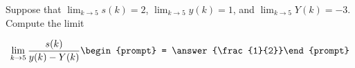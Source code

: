 \documentclass{ximera}
\author{Matthew Carr}
\begin{document}
\begin{exercise}
Suppose that $\lim_{k\to5}s(k)=2$, $\lim_{k\to5}y(k)=1$, and $\lim_{k\to5}Y(k)=-3$. Compute the limit

\[
\lim_{k\to 5 } \frac{s(k)}{y(k)-Y(k)}\begin{prompt} = \answer{\frac{1}{2}}\end{prompt}
\]
\end{exercise}
\end{document}
